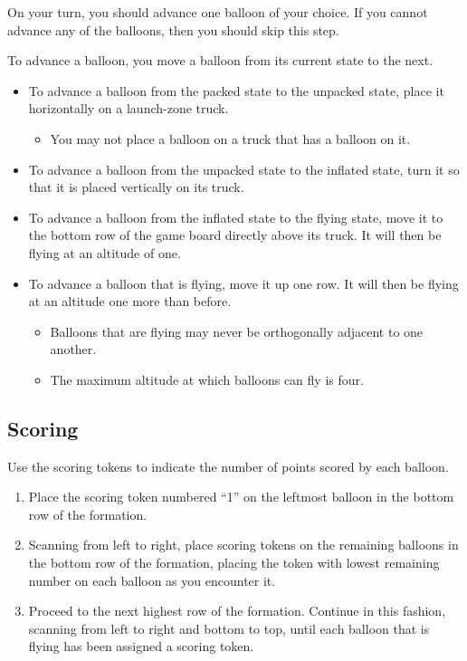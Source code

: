 \documentclass[a6paper, 11pt, parskip=half, DIV=15]{scrartcl}
\begin{document}
On your turn, you should advance one balloon of your choice. If you cannot advance any of the balloons, then you should skip this step.

\newpage
To advance a balloon, you move a balloon from its current state to the next.
\begin{itemize}
  \item To advance a balloon from the packed state to the unpacked state, place it horizontally on a launch-zone truck.
  \begin{itemize}[nosep]
    \item You may not place a balloon on a truck that has a balloon on it.
  \end{itemize}
  \item To advance a balloon from the unpacked state to the inflated state, turn it so that it is placed vertically on its truck.
  \item To advance a balloon from the inflated state to the flying state, move it to the bottom row of the game board directly above its truck. It will then be flying at an altitude of one.
  \item To advance a balloon that is flying, move it up one row. It will then be flying at an altitude one more than before.
  \begin{itemize}[nosep]
    \item Balloons that are flying may never be orthogonally adjacent to one another.%
    \item The maximum altitude at which balloons can fly is four.
  \end{itemize}
\end{itemize}

\newpage
\enlargethispage{1.75\baselineskip}
\subsection*{Scoring}

Use the scoring tokens to indicate the number of points scored by each balloon.
\begin{enumerate}
  \item Place the scoring token numbered ``1'' on the leftmost balloon in the bottom row of the formation.
  \item Scanning from left to right, place scoring tokens on the remaining balloons in the bottom row of the formation, placing the token with lowest remaining number on each balloon as you encounter it.
  \item Proceed to the next highest row of the formation. Continue in this fashion, scanning from left to right and bottom to top, until each balloon that is flying has been assigned a scoring token.
\end{enumerate}
\end{document}
